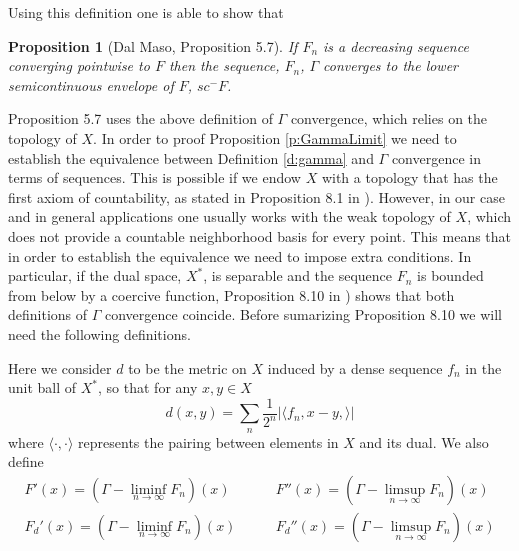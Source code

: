 \documentclass[11pt]{article}
\theoremstyle{plain}
\newtheorem*{Proposition*}{Proposition}
\begin{document}
Using this definition one is able to show that
\begin{Proposition*}[Dal Maso, Proposition 5.7]
If $F_n$ is a decreasing sequence converging pointwise to $F$ then the sequence, $F_n$, $\Gamma$ converges to the lower semicontinuous envelope of $F$, $sc^-F$.
\end{Proposition*}

Proposition 5.7 uses the above definition of $\Gamma$ convergence, which relies on the topology of $X$.  In order to proof  Proposition \ref{p:GammaLimit} we need to establish the equivalence between Definition \ref{d:gamma} and $\Gamma$ convergence in terms of sequences. This is possible if we endow $X$ with a topology that has the first axiom of countability, as stated in Proposition 8.1 in \cite{dal2012introduction}). However, in our case and in general applications one usually works with the weak topology of $X$, which does not provide a countable neighborhood basis for every point. This means that in order to establish the equivalence  we need to impose extra conditions. In particular, if the dual space, $X^*$, is separable and the sequence $F_n$ is bounded from below by a coercive function,  Proposition 8.10 in \cite{dal2012introduction}) shows that both definitions of $\Gamma$ convergence coincide. Before sumarizing Proposition 8.10 we will need the following definitions.

Here we consider $d$ to be the metric on $X$ induced by a dense sequence $f_n$ in the unit ball of $ X^*$, so that for any $x,y \in X$
\[ d(x,y) = \sum_n \frac{1}{2^n} \left | \langle f_n, x-y, \rangle \right|\]
where $\langle \cdot, \cdot \rangle$ represents the pairing between elements in $X$ and its dual. 
We also define 
\begin{align*}
 F' (x) = (\Gamma-\liminf_{n \to \infty} F_n)(x) & \qquad F'' (x) = (\Gamma-\limsup_{n \to \infty} F_n)(x) \\
 F_d' (x) = (\Gamma-\liminf_{n \to \infty} F_n)(x) & \qquad F_d'' (x) = (\Gamma-\limsup_{n \to \infty} F_n)(x) 
\end{align*}
\end{document}

